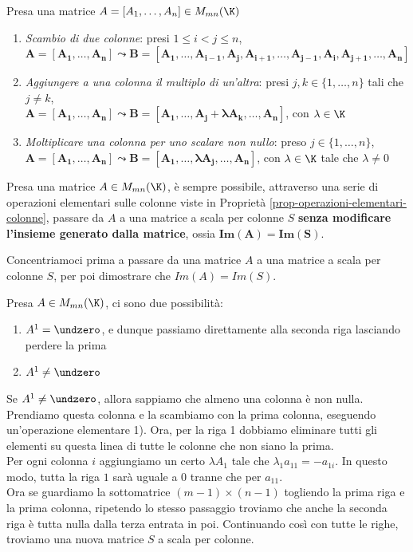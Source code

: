 \documentclass[11pt, a4paper, titlepage, oneside]{scrbook}
\begin{document}
\begin{Proprieta}
\label{prop-operazioni-elementari-colonne}
Presa una matrice $A = [A_1, \ldots, A_n] \in M_{mn}(\K)$ 
\begin{enumerate}
\item \textit{Scambio di due colonne}: presi $1 \leq i < j \leq n$, \\
$\bm{A = [A_1, \ldots, A_n] \leadsto B = [A_1, \ldots, A_{i-1}, A_j, A_{i+1}, \ldots, A_{j-1}, A_i, A_{j+1}, \ldots, A_n]}$
\item \textit{Aggiungere a una colonna il multiplo di un'altra}: presi $j,k \in \{1, \ldots, n\}$ tali che $j \neq k$,\\
$\bm{A = [A_1, \ldots, A_n] \leadsto B = [A_1, \ldots, A_j + \lambda A_k, \ldots, A_n]}$, con $\lambda \in \K$
\item \textit{Moltiplicare una colonna per uno scalare non nullo}: preso $j \in \{1, \ldots, n\}$, \\
$\bm{A = [A_1, \ldots, A_n] \leadsto B = [A_1, \ldots, \lambda A_j, \ldots, A_n]}$, con $\lambda \in \K$ tale che $\lambda \neq 0$
\end{enumerate}
\end{Proprieta}

\begin{Proposizione}[]
\label{propos-arrivare-matrice-a-scala-per-colonne}
Presa una matrice $A \in M_{mn}(\K)$, è sempre possibile, attraverso una serie di operazioni elementari sulle colonne viste in Proprietà \ref{prop-operazioni-elementari-colonne}, passare da $A$ a una matrice a scala per colonne $S$ \textbf{senza modificare l'insieme generato dalla matrice}, ossia $\bm{Im (A) = Im (S)}$.
\end{Proposizione}

\Dimostrazione \nopagebreak

Concentriamoci prima a passare da una matrice $A$ a una matrice a scala per colonne $S$, per poi dimostrare che $Im(A) = Im(S)$.

Presa $A \in M_{mn}(\K)$, ci sono due possibilità:
\begin{enumerate}[label=\arabic*°]
    \item $A^1 = \undzero$, e dunque passiamo direttamente alla seconda riga lasciando perdere la prima
    \item $A^1 \neq \undzero$
\end{enumerate} 
Se $A^1 \neq \undzero$, allora sappiamo che almeno una colonna è non nulla. Prendiamo questa colonna e la scambiamo con la prima colonna, eseguendo un'operazione elementare 1). Ora, per la riga 1 dobbiamo eliminare tutti gli elementi su questa linea di tutte le colonne che non siano la prima. \\
Per ogni colonna $i$ aggiungiamo un certo $\lambda A_1$ tale che $\lambda_1 a_{11} = - a_{1i}$. In questo modo, tutta la riga $1$ sarà uguale a $0$ tranne che per $a_{11}$. \\
Ora se guardiamo la sottomatrice $(m - 1) \times (n - 1)$ togliendo la prima riga e la prima colonna, ripetendo lo stesso passaggio troviamo che anche la seconda riga è tutta nulla dalla terza entrata in poi. Continuando così con tutte le righe, troviamo una nuova matrice $S$ a scala per colonne.
\end{document}
